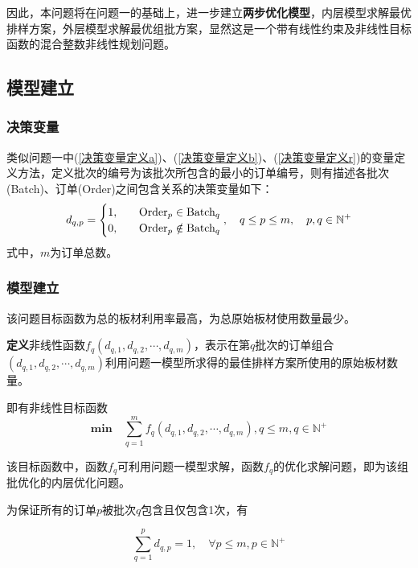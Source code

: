 \documentclass[bwprint]{gmcmthesis}
\begin{document}
因此，本问题将在问题一的基础上，进一步建立\textbf{两步优化模型}，内层模型求解最优排样方案，外层模型求解最优组批方案，显然这是一个带有线性约束及非线性目标函数的混合整数非线性规划问题。

\subsection{模型建立}


\subsubsection{决策变量}

类似问题一中(\ref{决策变量定义a})、(\ref{决策变量定义b})、(\ref{决策变量定义r})的变量定义方法，定义批次的编号为该批次所包含的最小的订单编号，则有描述各批次(Batch)、订单(Order)之间包含关系的决策变量如下：
\begin{equation}   %
    d_{q,p}=
    \begin{cases}
        1, \quad  & \text{Order}_p \in  \text{Batch}_q \\
        0,\quad  & \text{Order}_p \notin  \text{Batch}_q \\
    \end{cases},\quad q\le p \le m,\quad p,q \in  \mathbb{N}^+\\
\end{equation}
\noindent 式中，$m$为订单总数。


\subsubsection{模型建立}
该问题目标函数为总的板材利用率最高，为总原始板材使用数量最少。

\textbf{定义}非线性函数$f_q(d_{q,1},d_{q,2},\cdots,d_{q,m})$，表示在第$q$批次的订单组合$(d_{q,1},d_{q,2},\cdots,d_{q,m})$利用问题一模型所求得的最佳排样方案所使用的原始板材数量。

即有非线性目标函数
\begin{equation}   
    \mathbf{min}\quad\sum_{q=1}^{m} f_q(d_{q,1},d_{q,2},\cdots,d_{q,m}),q\le m ,q\in  \mathbb{N}^+\label{目标函数2}
\end{equation}

该目标函数中，函数$f_q$可利用问题一模型求解，函数$f_q$的优化求解问题，即为该组批优化的内层优化问题。

为保证所有的订单$p$被批次$q$包含且仅包含1次，有

\begin{equation}   
    \sum_{q=1}^{p} d_{q,p}=1,\quad \forall p\le m,p \in \mathbb{N}^+ \label{订单必须排} 
\end{equation}
\end{document}
